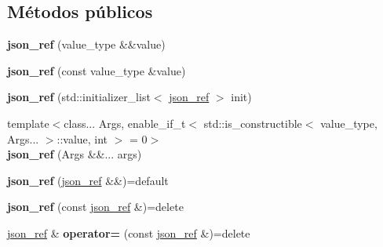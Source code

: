 \subsection*{Métodos públicos}
\begin{DoxyCompactItemize}
\item 
\mbox{\label{classnlohmann_1_1detail_1_1json__ref_ae1adf5bcee8b6fa0c358710604fb1938}} 
{\bfseries json\+\_\+ref} (value\+\_\+type \&\&value)
\item 
\mbox{\label{classnlohmann_1_1detail_1_1json__ref_a8c3eb3c6e952ed0cd7eece586ab4047c}} 
{\bfseries json\+\_\+ref} (const value\+\_\+type \&value)
\item 
\mbox{\label{classnlohmann_1_1detail_1_1json__ref_adfba2db547283a7c6a5df9a32e72efc5}} 
{\bfseries json\+\_\+ref} (std\+::initializer\+\_\+list$<$ \mbox{\hyperlink{classnlohmann_1_1detail_1_1json__ref}{json\+\_\+ref}} $>$ init)
\item 
\mbox{\label{classnlohmann_1_1detail_1_1json__ref_a8a31d6c588d6c3c06b62008fd5d36c6c}} 
{\footnotesize template$<$class... Args, enable\+\_\+if\+\_\+t$<$ std\+::is\+\_\+constructible$<$ value\+\_\+type, Args... $>$\+::value, int $>$  = 0$>$ }\\{\bfseries json\+\_\+ref} (Args \&\&... args)
\item 
\mbox{\label{classnlohmann_1_1detail_1_1json__ref_a59221ddbd756ca24d289c787fab38dbc}} 
{\bfseries json\+\_\+ref} (\mbox{\hyperlink{classnlohmann_1_1detail_1_1json__ref}{json\+\_\+ref}} \&\&)=default
\item 
\mbox{\label{classnlohmann_1_1detail_1_1json__ref_a4c68db46934e03588bbd73b00147c0dd}} 
{\bfseries json\+\_\+ref} (const \mbox{\hyperlink{classnlohmann_1_1detail_1_1json__ref}{json\+\_\+ref}} \&)=delete
\item 
\mbox{\label{classnlohmann_1_1detail_1_1json__ref_a98956ba676b1ae16b62346f9c4fb752e}} 
\mbox{\hyperlink{classnlohmann_1_1detail_1_1json__ref}{json\+\_\+ref}} \& {\bfseries operator=} (const \mbox{\hyperlink{classnlohmann_1_1detail_1_1json__ref}{json\+\_\+ref}} \&)=delete

\end{DoxyCompactItemize}
